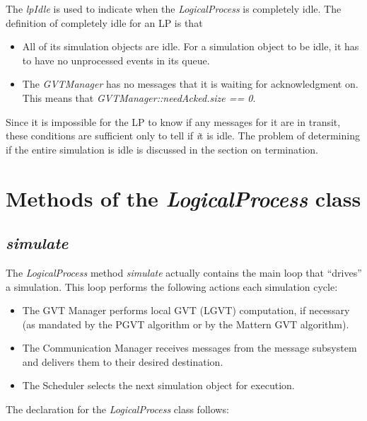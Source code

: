 \documentclass[11pt]{report}
\begin{document}
The {\it lpIdle} is used to indicate when the {\it LogicalProcess} is
completely idle.  The definition of completely idle for an LP is that

\begin{itemize}	
\item	
All of its simulation objects are idle.  For a simulation object to be
idle, it has to have no unprocessed events in its queue.
\item
The {\it GVTManager} has no messages that it is waiting for
acknowledgment on.  This means that {\it GVTManager::needAcked.size ==
0}.
\end{itemize}

Since it is impossible for the LP to know if any messages for it are in
transit, these conditions are sufficient only to tell if {\emph it} is
idle.  The problem of determining if the entire simulation is idle is
discussed in the section on termination.

\section{Methods of the {\it LogicalProcess} class}

\subsection{{\it simulate}}

The {\it LogicalProcess} method {\it simulate} actually contains the
main loop that ``drives'' a simulation.  This loop performs the
following actions each simulation cycle:

\begin{itemize}
\item
The GVT Manager performs local GVT (LGVT) computation, if necessary (as
mandated by the PGVT algorithm or by the Mattern GVT algorithm).

\item
The Communication Manager receives messages from the message subsystem
and delivers them to their desired destination.

\item
The Scheduler selects the next simulation object for execution.

\end{itemize}

The declaration for the {\it LogicalProcess} class follows:
\end{document}
